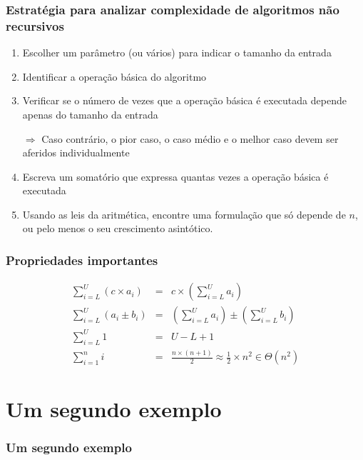 \documentclass[handout]{beamer}
\begin{document}
\begin{frame}
\frametitle{Estratégia para analizar complexidade de algoritmos não recursivos}

\begin{enumerate}
\item Escolher um parâmetro (ou vários) para indicar o tamanho da entrada
\item Identificar a operação básica do algoritmo
\item Verificar se o número de vezes que a operação básica é executada depende apenas do tamanho da entrada

\alert{$\Rightarrow$} Caso contrário, o pior caso, o caso médio e o melhor caso devem ser aferidos individualmente
\item Escreva um somatório que expressa quantas vezes a operação básica é executada
\item Usando as leis da aritmética, encontre uma formulação que só depende de $n$, ou pelo menos o seu crescimento asintótico.
\end{enumerate}

\end{frame}

\begin{frame}
\frametitle{Propriedades importantes}

\begin{eqnarray*}
\sum_{i=L}^U \left(c \times a_i\right) & = & c \times \left(\sum_{i = L}^U a_i \right) \\
\sum_{i=L}^U \left(a_i \pm b_i\right) & = & \left(\sum_{i = L}^U a_i \right) \pm \left(\sum_{i = L}^U b_i \right) \\
\sum_{i=L}^U 1 & = & U - L + 1 \\
\sum_{i=1}^n i & = & \frac{n\times (n+1)}{2} \approx \frac{1}{2}\times n^2 \in \Theta(n^2)
\end{eqnarray*}

\end{frame}

\section{Um segundo exemplo}
\begin{frame}
\frametitle{Um segundo exemplo}
\begin{example}

\end{example}
\end{frame}
\end{document}
